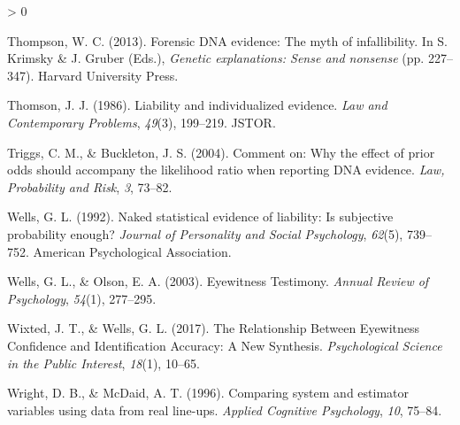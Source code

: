 \documentclass[
  10pt,
  dvipsnames,enabledeprecatedfontcommands]{scrartcl}
\newlength{\cslhangindent}
\newenvironment{CSLReferences}[2] %
 {%
  \setlength{\parindent}{0pt}
  \ifodd #1 \everypar{\setlength{\hangindent}{\cslhangindent}}\ignorespaces\fi
  \ifnum #2 > 0
  \setlength{\parskip}{#2\baselineskip}
  \fi
 }%
 {}
\begin{document}
\begin{CSLReferences}{1}{0}
\leavevmode\hypertarget{ref-thompson2012forensic}{}%
Thompson, W. C. (2013). Forensic DNA evidence: The myth of
infallibility. In S. Krimsky \& J. Gruber (Eds.), \emph{Genetic
explanations: Sense and nonsense} (pp. 227--347). Harvard University
Press.

\leavevmode\hypertarget{ref-thomson1986liability}{}%
Thomson, J. J. (1986). Liability and individualized evidence. \emph{Law
and Contemporary Problems}, \emph{49}(3), 199--219. JSTOR.

\leavevmode\hypertarget{ref-triggsCommentWhyEffect}{}%
Triggs, C. M., \& Buckleton, J. S. (2004). Comment on: {Why} the effect
of prior odds should accompany the likelihood ratio when reporting {DNA}
evidence. \emph{Law, Probability and Risk}, \emph{3}, 73--82.

\leavevmode\hypertarget{ref-wells1992naked}{}%
Wells, G. L. (1992). Naked statistical evidence of liability: Is
subjective probability enough? \emph{Journal of Personality and Social
Psychology}, \emph{62}(5), 739--752. American Psychological Association.

\leavevmode\hypertarget{ref-wells2003EyewitnessTestimony}{}%
Wells, G. L., \& Olson, E. A. (2003). Eyewitness {Testimony}.
\emph{Annual Review of Psychology}, \emph{54}(1), 277--295.

\leavevmode\hypertarget{ref-wixted2017RelationshipEyewitnessConfidence}{}%
Wixted, J. T., \& Wells, G. L. (2017). The {Relationship Between
Eyewitness Confidence} and {Identification Accuracy}: {A New Synthesis}.
\emph{Psychological Science in the Public Interest}, \emph{18}(1),
10--65.

\leavevmode\hypertarget{ref-Wright1996ComparingSystemEstimator}{}%
Wright, D. B., \& McDaid, A. T. (1996). Comparing system and estimator
variables using data from real line-ups. \emph{Applied Cognitive
Psychology}, \emph{10}, 75--84.

\end{CSLReferences}
\end{document}
